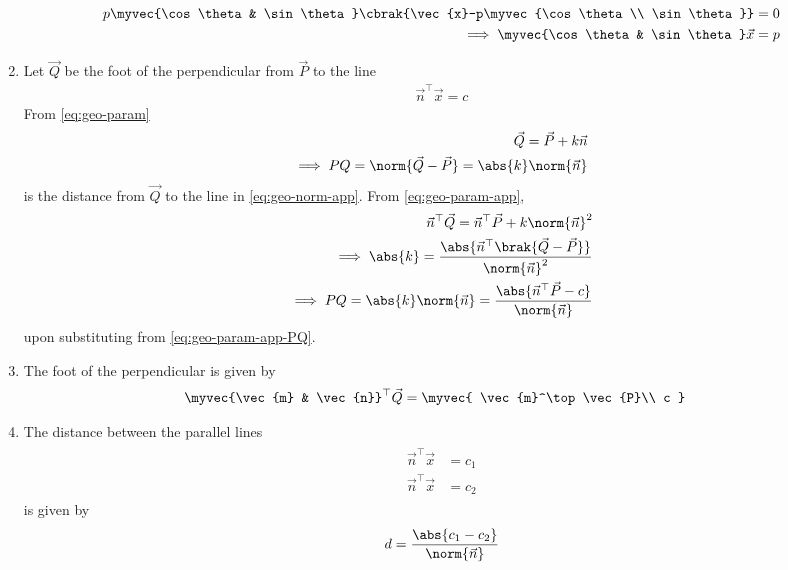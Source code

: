 \begin{enumerate}[label=\thesubsubsection.\arabic*.,ref=\thesubsubsection.\theenumi]
\begin{align}
	p\myvec{\cos \theta & \sin \theta}
	\cbrak{\vec{x}-p\myvec{\cos \theta \\ \sin \theta}} &= 0
	\\
	\implies 
	\myvec{\cos \theta & \sin \theta}
	\vec{x} &= p
\label{eq:chapters/11/10/2/8-final}
\end{align}
\item Let $\vec{Q}$ be the foot of the perpendicular from $\vec{P}$
	to the line
\begin{align}
			\label{eq:geo-norm-app}
    \vec{n}^{\top}  \vec{x} = c
\end{align}
From
			\eqref{eq:geo-param}
\begin{align}
			\label{eq:geo-param-app}
	\vec{Q} = \vec{P} + k\vec{n}
	\\
	\implies PQ = \norm{\vec{Q} - \vec{P}}=\abs{k} \norm{\vec{n}}
			\label{eq:geo-param-app-PQ}
\end{align}
is the distance from $\vec{Q}$
to the line in 
			\eqref{eq:geo-norm-app}.
			From \eqref{eq:geo-param-app},
\begin{align}
	\vec{n}^{\top}  \vec{Q} = \vec{n}^{\top}  \vec{P} + k\norm{\vec{n}}^2
	\\
	\implies \abs{k} = 
	\frac{\abs{\vec{n}^{\top}\brak{\vec{Q} - \vec{P}}}}{\norm{\vec{n}}^2}
			\label{eq:geo-param-app-k}
			\\
	\implies PQ =\abs{k}  
		\norm{\vec{n}}	=
	\frac{\abs{\vec{n}^{\top}\vec{P} - c}}{\norm{\vec{n}}}
			\label{eq:PQ-final}
\end{align}
upon substituting from 
			\eqref{eq:geo-param-app-PQ}.
\item The foot of the perpendicular is given by
\begin{align}
	\label{eq:11/10/3/4/foot_of_perpendicular}
	\myvec{\vec{m} & \vec{n}}^\top\vec{Q} &= 
	   \myvec{
              \vec{m}^\top\vec{P}\\
	      c
	      }
\end{align}
\item The distance between the parallel lines 
\begin{align}
	\label{eq:parallel_lines}
	\begin{split}
		\vec{n}^{\top}\vec{x} &= c_1
		\\
		\vec{n}^{\top}\vec{x} &= c_2
	\end{split}
\end{align}
is given by 
\begin{align}
	\label{eq:dist_lines_2d}
	d = \frac{\abs{   c_1-c_2 }}{\norm{\vec{n}}}	
\end{align}

\end{enumerate}
